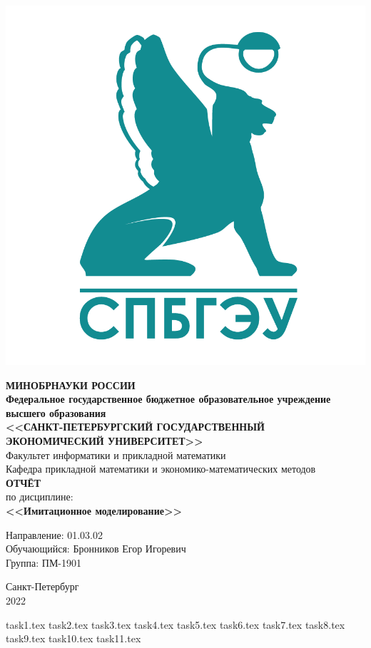 \documentclass[14pt,fleqn]{extarticle}
\begin{document}
	\begin{titlepage}
		\includegraphics[scale=0.12]{logo}
		\begin{center}
			\textbf{МИНОБРНАУКИ РОССИИ}\\
			\vspace{0.2cm}
			\textbf{Федеральное государственное бюджетное образовательное учреждение высшего образования}\\
			\textbf{<<САНКТ-ПЕТЕРБУРГСКИЙ ГОСУДАРСТВЕННЫЙ ЭКОНОМИЧЕСКИЙ УНИВЕРСИТЕТ>>}\\
			\vspace{0.6cm}
			Факультет информатики и прикладной математики\\
			Кафедра прикладной математики и экономико-математических методов\\
			\vspace{1cm}
			\textbf{ОТЧЁТ}\\
			по дисциплине:\\
			\textbf{<<Имитационное моделирование>>}\\
		\end{center}
		\vspace{3cm}
		Направление: 01.03.02\\
		Обучающийся: Бронников Егор Игоревич\\
		Группа: ПМ-1901\\
		\vfill
		\begin{center}
			Санкт-Петербург\\
			2022\\
		\end{center}
	\end{titlepage}
	
	\tableofcontents
	\newpage
	{task1.tex}
	\newpage
	{task2.tex}
	\newpage
	{task3.tex}
	\newpage
	{task4.tex}
	\newpage
	{task5.tex}
	\newpage
	{task6.tex}
	\newpage
	{task7.tex}
	\newpage
	{task8.tex}
	\newpage
	{task9.tex}
	\newpage
	{task10.tex}
	\newpage
	{task11.tex}
\end{document}
